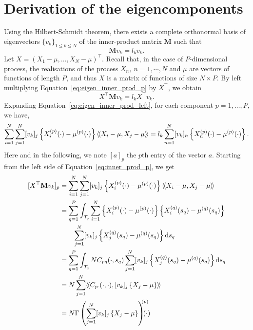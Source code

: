 \section{Derivation of the eigencomponents} %
\label{sec:derivation_of_the_eigencomponents}

Using the Hilbert-Schmidt theorem, there exists a complete orthonormal basis of eigenvectors $\{v_k\}_{1 \leq k \leq N}$ of the inner-product matrix $\mathbf{M}$ such that
\begin{equation}\label{eq:eigen_inner_prod_p}
    \mathbf{M}v_k = l_kv_k.
\end{equation}
Let $X = \left(X_1 - \mu, \dots, X_N - \mu\right)^\top$. Recall that, in the case of $P$-dimensional process, the realisations of the process $X_n,~n = 1, \cdots, N$ and $\mu$ are vectors of functions of length $P$, and thus $X$ is a matrix of functions of size $N \times P$. By left multiplying Equation~\eqref{eq:eigen_inner_prod_p} by $X^\top$, we obtain
\begin{equation}\label{eq:eigen_inner_prod_left}
    X^\top \mathbf{M} v_k = l_k X^\top v_k.
\end{equation} 
Expanding Equation~\eqref{eq:eigen_inner_prod_left}, for each component $p = 1, \dots, P$, we have,
\begin{equation}\label{eq:inner_prod_p}
    \sum_{i = 1}^N \sum_{j = 1}^N [v_{k}]_j\left\{X_i^{(p)}(\cdot) - \mu^{(p)}(\cdot)\right\}\langle\!\langle X_i - \mu, X_j - \mu\rangle\!\rangle = l_k \sum_{n = 1}^N [v_{k}]_n\left\{X_n^{(p)}(\cdot) - \mu^{(p)}(\cdot)\right\}.
\end{equation}
Here and in the following, we note $[a]_p$ the $p$th entry of the vector $a$. Starting from the left side of Equation~\eqref{eq:inner_prod_p}, we get
\begin{align}\label{eq:inner_prod_p_left}
[X^\top \mathbf{M} v_k]_p &= \sum_{i = 1}^N \sum_{j = 1}^N [v_{k}]_j \left\{X_i^{(p)}(\cdot) - \mu^{(p)}(\cdot)\right\}\inH{X_i - \mu}{X_j - \mu}\\
&= \sum_{q = 1}^P \int_{\TT{q}} \sum_{i = 1}^N \left\{X_i^{(p)}(\cdot) - \mu^{(p)}(\cdot)\right\} \left\{X_i^{(q)}(s_q) - \mu^{(q)}(s_q)\right\}  \\
&\quad\quad \sum_{j = 1}^N [v_{k}]_j \left\{X_j^{(q)}(s_q) - \mu^{(q)}(s_q)\right\} \dd s_q \\
&= \sum_{q = 1}^P \int_{\TT{q}} N C_{pq}(\cdot, s_q)\sum_{j = 1}^N [v_{k}]_j \left\{X_j^{(q)}(s_q) - \mu^{(q)}(s_q)\right\} \dd s_q \\
&= N \sum_{j = 1}^N \inH{C_{p \cdot}(\cdot, \cdot)}{[v_{k}]_j \left\{X_j - \mu\right\}} \\
&= N \Gamma\left(\sum_{j = 1}^N [v_{k}]_j \left\{X_j - \mu\right\} \right)^{\mkern-9mu(p)}\mkern-18mu(\cdot)
\end{align}
